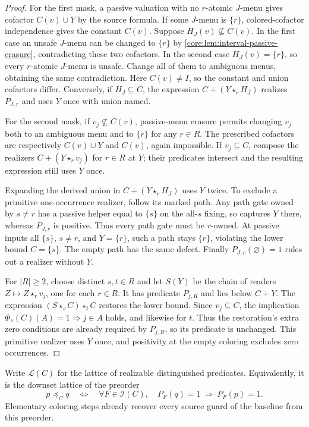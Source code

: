\begin{proof}
For the first mask, a passive valuation with no $r$-atomic $J$-menu
gives cofactor $C(v)\cup Y$ by the source formula. If some $J$-menu
is $\{r\}$, colored-cofactor independence gives the constant $C(v)$.
Suppose $H_J(v)\nsubseteq C(v)$. In the first case an unsafe $J$-menu
can be changed to $\{r\}$ by \cref{core:lem:interval-passive-erasure},
contradicting these two cofactors. In the second case $H_J(v)=\{r\}$,
so every $r$-atomic $J$-menu is unsafe. Change all of them to ambiguous
menus, obtaining the same contradiction. Here $C(v)\ne I$, so the
constant and union cofactors differ.
Conversely, if $H_J\subseteq C$, the expression
$C+(Y\star_r H_J)$ realizes $P_{J,r}$ and uses $Y$ once with union
named.

For the second mask, if $v_j\nsubseteq C(v)$, passive-menu erasure
permits changing $v_j$ both to an ambiguous menu and to $\{r\}$ for
any $r\in R$. The prescribed cofactors are respectively $C(v)\cup Y$
and $C(v)$, again impossible. If $v_j\subseteq C$, compose the
realizers $C+(Y\star_r v_j)$ for $r\in R$ at $Y$; their predicates
intersect and the resulting expression still uses $Y$ once.

Expanding the derived union in $C+(Y\star_r H_J)$ uses $Y$ twice.
To exclude a primitive one-occurrence realizer, follow its marked path.
Any path gate owned by $s\ne r$ has a passive helper equal to
$\{s\}$ on the all-$s$ fixing, so captures $Y$ there, whereas
$P_{J,r}$ is positive. Thus every path gate must be $r$-owned.
At passive inputs all $\{s\}$, $s\ne r$, and $Y=\{r\}$, such a
path stays $\{r\}$, violating the lower bound $C=\{s\}$.
The empty path has the same defect. Finally $P_{J,r}(\varnothing)=1$
rules out a realizer without $Y$.

For $|R|\geq2$, choose distinct $s,t\in R$ and let $S(Y)$ be the
chain of readers $Z\mapsto Z\star_r v_j$, one for each $r\in R$.
It has predicate $P_{j,R}$ and lies below $C+Y$. The expression
$(S\star_s C)\star_t C$ restores the lower bound.
Since $v_j\subseteq C$, the implication
$\Phi_s(C)(A)=1\Rightarrow j\in A$ holds, and likewise for $t$.
Thus the restoration's extra zero conditions are already required by
$P_{j,R}$, so its predicate is unchanged. This primitive realizer uses
$Y$ once, and positivity at the empty coloring excludes zero occurrences.
\end{proof}

Write $\mathcal L(C)$ for the lattice of realizable distinguished
predicates. Equivalently, it is the downset lattice of the preorder
\[
 p\preceq_C q\quad\Longleftrightarrow\quad
 \forall F\in\mathcal I(C),\quad P_F(q)=1\ \Longrightarrow\ P_F(p)=1.
\]
Elementary coloring steps already recover every source guard of the
baseline from this preorder.

